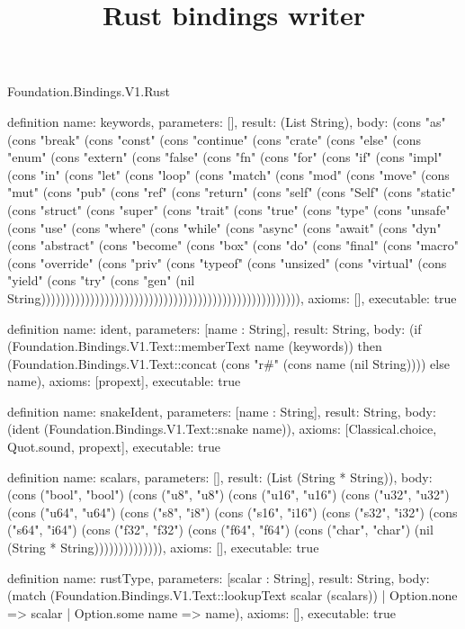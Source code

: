 \begin{lexlean}{Foundation.Bindings.V1.Rust}
\title{Rust bindings writer}
\begin{semanticmodule}
definition{
  name: keywords,
  parameters: [],
  result: (List String),
  body: (cons "as" (cons "break" (cons "const" (cons "continue" (cons "crate" (cons "else" (cons "enum" (cons "extern" (cons "false" (cons "fn" (cons "for" (cons "if" (cons "impl" (cons "in" (cons "let" (cons "loop" (cons "match" (cons "mod" (cons "move" (cons "mut" (cons "pub" (cons "ref" (cons "return" (cons "self" (cons "Self" (cons "static" (cons "struct" (cons "super" (cons "trait" (cons "true" (cons "type" (cons "unsafe" (cons "use" (cons "where" (cons "while" (cons "async" (cons "await" (cons "dyn" (cons "abstract" (cons "become" (cons "box" (cons "do" (cons "final" (cons "macro" (cons "override" (cons "priv" (cons "typeof" (cons "unsized" (cons "virtual" (cons "yield" (cons "try" (cons "gen" (nil String))))))))))))))))))))))))))))))))))))))))))))))))))))),
  axioms: [],
  executable: true
}

definition{
  name: ident,
  parameters: [name : String],
  result: String,
  body: (if (Foundation.Bindings.V1.Text::memberText name (keywords)) then (Foundation.Bindings.V1.Text::concat (cons "r#" (cons name (nil String)))) else name),
  axioms: [propext],
  executable: true
}

definition{
  name: snakeIdent,
  parameters: [name : String],
  result: String,
  body: (ident (Foundation.Bindings.V1.Text::snake name)),
  axioms: [Classical.choice, Quot.sound, propext],
  executable: true
}

definition{
  name: scalars,
  parameters: [],
  result: (List (String * String)),
  body: (cons ("bool", "bool") (cons ("u8", "u8") (cons ("u16", "u16") (cons ("u32", "u32") (cons ("u64", "u64") (cons ("s8", "i8") (cons ("s16", "i16") (cons ("s32", "i32") (cons ("s64", "i64") (cons ("f32", "f32") (cons ("f64", "f64") (cons ("char", "char") (nil (String * String)))))))))))))),
  axioms: [],
  executable: true
}

definition{
  name: rustType,
  parameters: [scalar : String],
  result: String,
  body: (match (Foundation.Bindings.V1.Text::lookupText scalar (scalars))
    | Option.none => scalar
    | Option.some name => name),
  axioms: [],
  executable: true
}


\end{semanticmodule}
\end{lexlean}
